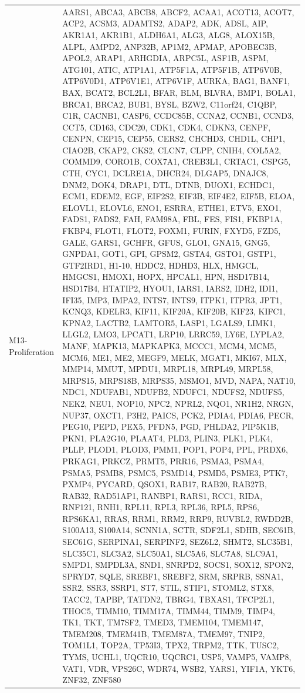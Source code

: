 \documentclass[
]{article}
\begin{document}
\begin{singlespace}
\begin{longtable}[t]{>{\raggedright\arraybackslash}p{1in}>{\raggedright\arraybackslash}p{5in}}
M13-Proliferation & AARS1, ABCA3, ABCB8, ABCF2, ACAA1, ACOT13, ACOT7, ACP2, ACSM3, ADAMTS2, ADAP2, ADK, ADSL, AIP, AKR1A1, AKR1B1, ALDH6A1, ALG3, ALG8, ALOX15B, ALPL, AMPD2, ANP32B, AP1M2, APMAP, APOBEC3B, APOL2, ARAP1, ARHGDIA, ARPC5L, ASF1B, ASPM, ATG101, ATIC, ATP1A1, ATP5F1A, ATP5F1B, ATP6V0B, ATP6V0D1, ATP6V1E1, ATP6V1F, AURKA, BAG1, BANF1, BAX, BCAT2, BCL2L1, BFAR, BLM, BLVRA, BMP1, BOLA1, BRCA1, BRCA2, BUB1, BYSL, BZW2, C11orf24, C1QBP, C1R, CACNB1, CASP6, CCDC85B, CCNA2, CCNB1, CCND3, CCT5, CD163, CDC20, CDK1, CDK4, CDKN3, CENPF, CENPN, CEP15, CEP55, CERS2, CHCHD3, CHD1L, CHP1, CIAO2B, CKAP2, CKS2, CLCN7, CLPP, CNIH4, COL5A2, COMMD9, CORO1B, COX7A1, CREB3L1, CRTAC1, CSPG5, CTH, CYC1, DCLRE1A, DHCR24, DLGAP5, DNAJC8, DNM2, DOK4, DRAP1, DTL, DTNB, DUOX1, ECHDC1, ECM1, EDEM2, EGF, EIF2S2, EIF3B, EIF4E2, EIF5B, ELOA, ELOVL1, ELOVL6, ENO1, ESRRA, ETHE1, ETV5, EXO1, FADS1, FADS2, FAH, FAM98A, FBL, FES, FIS1, FKBP1A, FKBP4, FLOT1, FLOT2, FOXM1, FURIN, FXYD5, FZD5, GALE, GARS1, GCHFR, GFUS, GLO1, GNA15, GNG5, GNPDA1, GOT1, GPI, GPSM2, GSTA4, GSTO1, GSTP1, GTF2IRD1, H1-10, HDDC2, HDHD3, HLX, HMGCL, HMGCS1, HMOX1, HOPX, HPCAL1, HPN, HSD17B14, HSD17B4, HTATIP2, HYOU1, IARS1, IARS2, IDH2, IDI1, IFI35, IMP3, IMPA2, INTS7, INTS9, ITPK1, ITPR3, JPT1, KCNQ3, KDELR3, KIF11, KIF20A, KIF20B, KIF23, KIFC1, KPNA2, LACTB2, LAMTOR5, LASP1, LGALS9, LIMK1, LLGL2, LMO3, LPCAT1, LRP10, LRRC59, LY6E, LYPLA2, MANF, MAPK13, MAPKAPK3, MCCC1, MCM4, MCM5, MCM6, ME1, ME2, MEGF9, MELK, MGAT1, MKI67, MLX, MMP14, MMUT, MPDU1, MRPL18, MRPL49, MRPL58, MRPS15, MRPS18B, MRPS35, MSMO1, MVD, NAPA, NAT10, NDC1, NDUFAB1, NDUFB2, NDUFC1, NDUFS2, NDUFS5, NEK2, NEU1, NOP10, NPC2, NPRL2, NQO1, NR1H2, NRGN, NUP37, OXCT1, P3H2, PAICS, PCK2, PDIA4, PDIA6, PECR, PEG10, PEPD, PEX5, PFDN5, PGD, PHLDA2, PIP5K1B, PKN1, PLA2G10, PLAAT4, PLD3, PLIN3, PLK1, PLK4, PLLP, PLOD1, PLOD3, PMM1, POP1, POP4, PPL, PRDX6, PRKAG1, PRKCZ, PRMT5, PRR16, PSMA3, PSMA4, PSMA5, PSMB8, PSMC5, PSMD14, PSMD5, PSME3, PTK7, PXMP4, PYCARD, QSOX1, RAB17, RAB20, RAB27B, RAB32, RAD51AP1, RANBP1, RARS1, RCC1, RIDA, RNF121, RNH1, RPL11, RPL3, RPL36, RPL5, RPS6, RPS6KA1, RRAS, RRM1, RRM2, RRP9, RUVBL2, RWDD2B, S100A13, S100A14, SCNN1A, SCTR, SDF2L1, SDHB, SEC61B, SEC61G, SERPINA1, SERPINF2, SEZ6L2, SHMT2, SLC35B1, SLC35C1, SLC3A2, SLC50A1, SLC5A6, SLC7A8, SLC9A1, SMPD1, SMPDL3A, SND1, SNRPD2, SOCS1, SOX12, SPON2, SPRYD7, SQLE, SREBF1, SREBF2, SRM, SRPRB, SSNA1, SSR2, SSR3, SSRP1, ST7, STIL, STIP1, STOML2, STX8, TACC2, TAPBP, TATDN2, TBRG4, TBXAS1, TFCP2L1, THOC5, TIMM10, TIMM17A, TIMM44, TIMM9, TIMP4, TK1, TKT, TM7SF2, TMED3, TMEM104, TMEM147, TMEM208, TMEM41B, TMEM87A, TMEM97, TNIP2, TOM1L1, TOP2A, TP53I3, TPX2, TRPM2, TTK, TUSC2, TYMS, UCHL1, UQCR10, UQCRC1, USP5, VAMP5, VAMP8, VAT1, VDR, VPS26C, WDR74, WSB2, YARS1, YIF1A, YKT6, ZNF32, ZNF580\\

\end{longtable}
\end{singlespace}
\end{document}
